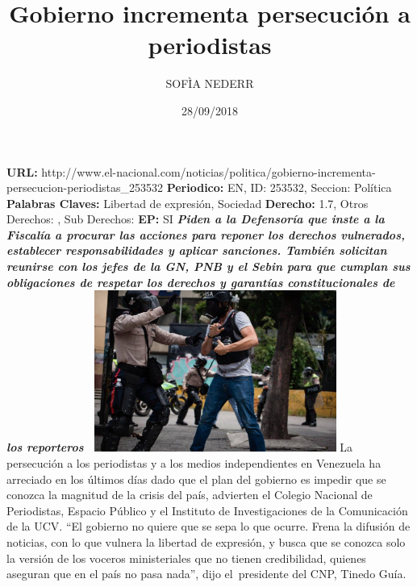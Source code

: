 \documentclass{article}%
\title{\textbf{Gobierno incrementa persecución a periodistas}}%
\author{SOFÌA NEDERR}%
\date{28/09/2018}%
\begin{document}
%
\normalsize%
\maketitle%
\textbf{URL: }%
http://www.el{-}nacional.com/noticias/politica/gobierno{-}incrementa{-}persecucion{-}periodistas\_253532\newline%
%
\textbf{Periodico: }%
EN, %
ID: %
253532, %
Seccion: %
Política\newline%
%
\textbf{Palabras Claves: }%
Libertad de expresión, Sociedad\newline%
%
\textbf{Derecho: }%
1.7, %
Otros Derechos: %
, %
Sub Derechos: %
\newline%
%
\textbf{EP: }%
SI\newline%
\newline%
%
\textbf{\textit{Piden a la Defensoría que inste a la Fiscalía a procurar las acciones para reponer los derechos vulnerados, establecer responsabilidades y aplicar sanciones. También solicitan reunirse con los jefes de la GN, PNB y el Sebin para que cumplan sus obligaciones de respetar los derechos y garantías constitucionales de los reporteros~}}%
\newline%
\newline%
%
\includegraphics[width=300px]{26.jpg}%
\newline%
%
La persecución a los periodistas y a los medios independientes en Venezuela ha arreciado en los últimos días dado que el plan del gobierno es impedir que se conozca la magnitud de la crisis del país, advierten el Colegio Nacional de Periodistas, Espacio Público y el Instituto de Investigaciones de la Comunicación de la UCV.%
\newline%
%
“El gobierno no quiere que se sepa lo que ocurre. Frena la difusión de noticias, con lo que vulnera la libertad de expresión, y busca que se conozca solo la versión de los voceros ministeriales que no tienen credibilidad, quienes aseguran que en el país no pasa nada”, dijo el~presidente del CNP, Tinedo Guía.%
\newline%
\end{document}
